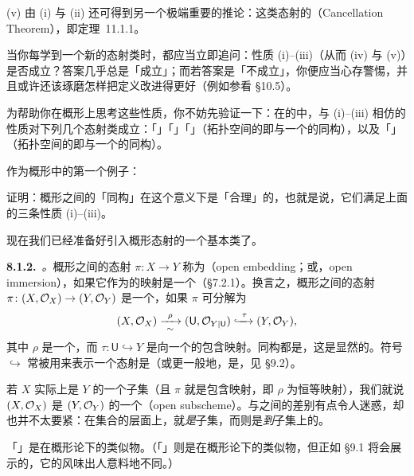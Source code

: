 (v) 由 (i) 与 (ii) 还可得到另一个极端重要的推论：这类态射的\emph{\trCancellationTheorem}（Cancellation Theorem），即定理~11.1.1。

当你每学到一个新的态射类时，都应当立即追问：性质 (i)--(iii)（从而 (iv) 与 (v)）是否成立？答案几乎总是「成立」；而若答案是「不成立」，你便应当心存警惕，并且或许还该琢磨怎样把定义改进得更好（例如参看 \S10.5）。

为帮助你在概形上思考这些性质，你不妨先验证一下：在\trTopologicalSpace{}的\trCategory{}中，与 (i)--(iii) 相仿的性质对下列几个态射类成立：「\trInjectiveMap」「\trSurjectiveMap」「\trOpenEmbedding」（拓扑空间的\trOpenEmbedding{}即与一个\trOpenSubset{}的同构），以及「\trClosedEmbedding」（拓扑空间的\trClosedEmbedding{}即与一个\trClosedSubset{}的同构）。

作为概形\trCategory{}中的第一个例子：

\begin{exercise}[容易的练习]\label{ex:isomorphisms-are-reasonable}
证明：概形之间的「同构」在这个意义下是「合理」的，也就是说，它们满足上面的三条性质 (i)--(iii)。
\end{exercise}

现在我们已经准备好引入概形态射的一个基本类了。

\textbf{8.1.2.}\ \emph{\trhDefinition{}。}\quad 概形之间的态射 $\pi\colon X\to Y$ 称为\textbf{\trOpenEmbedding}（open embedding；或\textbf{\trOpenImmersion}，open immersion），如果它作为\trRingedSpace{}的映射是一个\trOpenEmbedding（\S7.2.1）。换言之，概形之间的态射 $\pi\colon(X,\mathcal{O}_X)\to(Y,\mathcal{O}_Y)$ 是一个\trOpenEmbedding，如果 $\pi$ 可分解为
\[
(X,\OO_X)\xrightarrow[\ \sim\ ]{\ \rho\ }(\mathsf{U},\OO_{Y|\mathsf{U}})\xhookrightarrow{\ \tau\ }(Y,\OO_Y),
\]
其中 $\rho$ 是一个\trIsomorphism，而 $\tau\colon\mathsf{U}\hookrightarrow Y$ 是向一个\trOpenSubset{}的包含映射。同构都是\trOpenEmbedding，这是显然的。符号 $\hookrightarrow$ 常被用来表示一个态射是\trOpenEmbedding{}（或更一般地，是\trLocally\trClosedEmbedding，见 \S9.2）。

若 $X$ 实际上是 $Y$ 的一个子集（且 $\pi$ 就是包含映射，即 $\rho$ 为恒等映射），我们就说 $(X,\mathcal{O}_X)$ 是 $(Y,\mathcal{O}_Y)$ 的一个\textbf{\trOpenSubscheme}（open subscheme）。\trOpenEmbedding{}与\trOpenSubscheme{}之间的差别有点令人迷惑，却也并不太要紧：在集合的层面上，\trOpenSubscheme{}就\emph{是}子集，而\trOpenEmbedding{}则是\emph{到}子集上的\trBijection。

「\trOpenSubscheme」是\trOpenSubset{}在概形论下的类似物。（「\trClosedSubscheme」则是\trClosedSubset{}在概形论下的类似物，但正如 \S9.1 将会展示的，它的风味出人意料地不同。）

